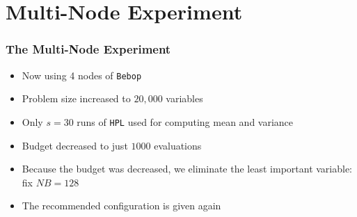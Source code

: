 \documentclass[aspectratio=169]{beamer}
\begin{document}
\section{Multi-Node Experiment}

\begin{frame}\frametitle{The Multi-Node Experiment}
	\begin{itemize}
		\item Now using 4 nodes of \texttt{Bebop}
		\item Problem size increased to $20,000$ variables
		\item Only $s=30$ runs of \texttt{HPL} used for computing
			mean and variance
		\item Budget decreased to just $1000$ evaluations
		\item Because the budget was decreased, we eliminate the
			least important variable: fix $NB=128$
		\item The recommended configuration is given again
	\end{itemize}
\end{frame}
\end{document}
